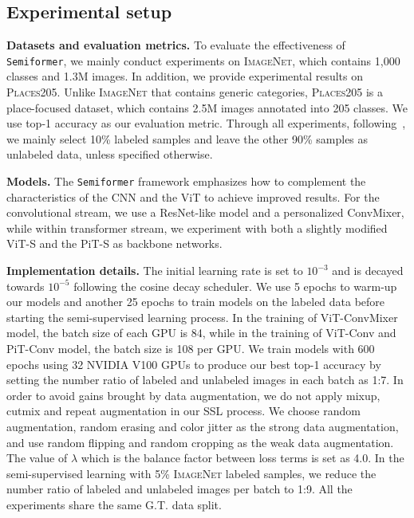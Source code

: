 \documentclass[runningheads]{llncs}
\makeatletter
\newcommand{\fakeparagraph}[1]{\textbf{#1}}
\newcommand*{\system}{\texttt{Semiformer}\@\xspace}
\newcommand{\inet}{{\scshape ImageNet}\xspace}
\newcommand{\places}{{\scshape Places205}\xspace}
\makeatother
\begin{document}
\subsection{Experimental setup}

\fakeparagraph{Datasets and evaluation metrics.}  To evaluate the effectiveness of \system, we mainly conduct experiments on \inet \cite{deng2009imagenet}, which contains 1,000 classes and 1.3M images.  In addition, we provide experimental results on \places. Unlike \inet that contains generic categories, \places is a place-focused dataset, which contains 2.5M images annotated into 205 classes. We use top-1 accuracy as our evaluation metric.  Through all experiments, following~\cite{sohn2020fixmatch}, we mainly select 10\% labeled samples and leave the other 90\% samples as unlabeled data, unless specified otherwise. 

\fakeparagraph{Models.} 
The \system framework emphasizes how to complement the characteristics of the CNN and the ViT to achieve improved results. 
For the convolutional stream, we use a ResNet-like model and a personalized ConvMixer\cite{trockman2022patches}, while within transformer stream, we experiment with both a slightly modified ViT-S\cite{touvron2021training} and the PiT-S\cite{heo2021rethinking} as backbone networks.

\fakeparagraph{Implementation details.} The initial learning rate is set to $10^{-3}$ and is decayed towards $10^{-5}$ following the cosine decay scheduler. We use 5 epochs to warm-up our models and another 25 epochs to train models on the labeled data before starting the semi-supervised learning process. In the training of ViT-ConvMixer model, the batch size of each GPU is 84, while in the training of ViT-Conv and PiT-Conv model, the batch size is 108 per GPU.  We train models with 600 epochs using 32 NVIDIA V100 GPUs to produce our best top-1 accuracy by setting the number ratio of labeled and unlabeled images in each batch as 1:7. In order to avoid gains brought by data augmentation, we do not apply mixup, cutmix and repeat augmentation in our SSL process. We choose random augmentation, random erasing and color jitter as the strong data augmentation, and use random flipping and random cropping as the weak data augmentation. The value of $\lambda$ which is the balance factor between loss terms is set as 4.0. In the semi-supervised learning with 5\% \inet labeled samples, we reduce the number ratio of labeled and unlabeled images per batch to 1:9. All the experiments share the same G.T. data split.
\end{document}

